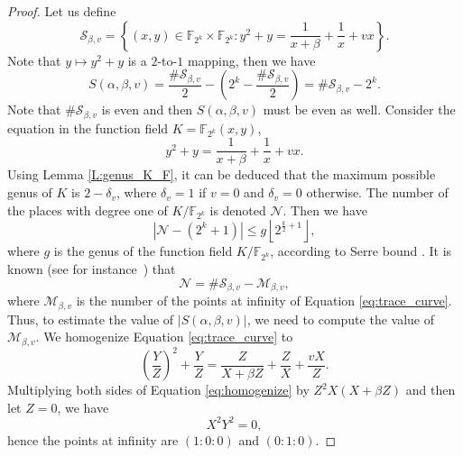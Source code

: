 \documentclass[preprint,10pt]{elsarticle}
\newcommand{\F}{\mathbb{F}}
\newcommand{\0}{\textbf{0}}
\newcommand{\1}{\textbf{1}}
\theoremstyle{plain}
\begin{document}
\begin{proof}
        Let us define
        \[\mathcal{S}_{\beta,v}=\left\{(x,y)\in\F_{2^k}\times\F_{2^k} : y^2+y=\frac{1}{x+\beta}+\frac{1}{x}+vx\right\}.\]
        Note that $y\mapsto y^2+y$ is a $2$-to-$1$ mapping, then we have
        \begin{equation}\label{eq:tracesum_S}
            S(\alpha,\beta,v)=\frac{\#\mathcal{S}_{\beta,v}}{2}-\left(2^k-\frac{\#\mathcal{S}_{\beta,v}}{2}\right)=\#\mathcal{S}_{\beta,v}-2^k.
        \end{equation}
        Note that $\#\mathcal{S}_{\beta,v}$ is even and then $S(\alpha,\beta,v)$ must be even as well.
        Consider the equation in the function field $K=\F_{2^k}(x,y)$, 
        \begin{equation}\label{eq:trace_curve}
            y^2+y=\frac{1}{x+\beta}+\frac{1}{x}+vx.
        \end{equation}
        Using Lemma \ref{L:genus_K_F}, it can be deduced that the maximum possible genus of $K$ is $2-\delta_v$,
        where $\delta_v=1$ if $v=0$ and $\delta_v=0$ otherwise.
        The number of the places with degree one of $K/\F_{2^k}$ is denoted $\mathcal{N}$.
        Then we have
        \begin{equation}\label{eq:N_genus_inequality}
            \left\lvert \mathcal{N}-(2^k+1)\right\rvert\le g\left\lfloor 2^{\frac{k}{2}+1}\right\rfloor,
        \end{equation}
        where $g$ is the genus of the function field $K/\F_{2^k}$, according to Serre bound \cite{Serre1982serrebound}.
        It is known (see for instance~\cite{Serre1982serrebound}) that
         \begin{equation}\label{eq:N_S_M_equality}
            \mathcal{N}=\#\mathcal{S}_{\beta,v}-\mathcal{M}_{\beta,v},
        \end{equation}
        where $\mathcal{M}_{\beta,v}$ is the number of the points at infinity of Equation \eqref{eq:trace_curve}.
        Thus, to estimate the value of $|S(\alpha,\beta,v)|$, we need to compute the value of $\mathcal{M}_{\beta,v}$.
        We homogenize Equation \eqref{eq:trace_curve} to
        \begin{equation}\label{eq:homogenize}
            \left( \frac{Y}{Z} \right)^2+\frac{Y}{Z}=\frac{Z}{X+\beta Z}+\frac{Z}{X}+\frac{vX}{Z}.
        \end{equation}
        Multiplying both sides of Equation \eqref{eq:homogenize} by $Z^2X\left( X+\beta Z \right)$ and then let $Z=0$,
        we have
        \[X^2Y^2=0,\]
        hence the points at infinity are $(1:0:0)$ and $(0:1:0)$.


\end{proof}
\end{document}
